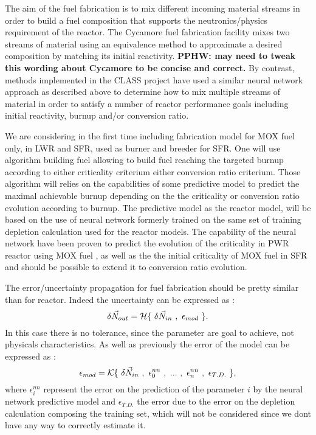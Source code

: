 \documentclass[dvips,12pt]{article}
\newcommand{\comment}[1]
{{\bfseries \color{red} #1}}
\begin{document}
The aim of the fuel fabrication is to mix
different incoming material streams in order to
build a fuel composition that supports the
neutronics/physics requirement of the reactor. The
Cycamore fuel fabrication facility mixes two
streams of material using an equivalence method to
approximate a desired composition by matching its
initial reactivity.  \cite{cycamore_fab}
\comment{PPHW: may need to tweak this wording
  about Cycamore to be concise and correct.}  By
contrast, methods implemented in the CLASS project
have used a similar neural network approach as
described above to determine how to mix multiple
streams of material in order to satisfy a number
of reactor performance goals including initial
reactivity, burnup and/or conversion ratio.

We are
considering in the first time including
fabrication model for MOX fuel only, in LWR and
SFR, used as burner and breeder for SFR. One will
use algorithm building fuel allowing to build fuel
reaching the targeted burnup according to either
criticality criterium either conversion ratio
criterium.  Those algorithm will relies on the
capabilities of some predictive model to predict
the maximal achievable burnup depending on the the
criticality or conversion ratio evolution
according to burnup.  The predictive model as the
reactor model, will be based on the use of neural
network formerly trained on the same set of
training depletion calculation used for the
reactor models. The capability of the neural
network have been proven to predict the evolution
of the criticality in PWR reactor using MOX fuel
\cite{Leniaux.NN, CLASS_UserManual}, as well as
the the initial criticality of MOX fuel in SFR
\cite{CLASS UserManual} and should be possible to
extend it to conversion ratio evolution.

The error/uncertainty propagation for fuel
fabrication should be pretty similar than for
reactor. Indeed the uncertainty can be expressed
as :
\begin{equation}
\delta \vec{N}_{out} = {\cal H}\{~\delta\vec{N}_{in}~,~\epsilon_{mod}~\}.
\end{equation}
In this case there is no tolerance, since the
parameter are goal to achieve, not physicals
characteristics. As well as previously the error
of the model can be expressed as :
\begin{equation}
\epsilon_{mod} = {\cal K}\{~\delta\vec{N}_{in}~,~\epsilon^{nn}_{0}~,~...~,~\epsilon^{nn}_{n}~,~\epsilon_{T.D.}~\},
\end{equation}
 where $\epsilon^{nn}_{i}$ represent the error on
 the prediction of the parameter $i$ by the neural
 network predictive model and $\epsilon_{T.D.}$
 the error due to the error on the depletion
 calculation composing the training set, which
 will not be considered since we dont have any way
 to correctly estimate it.\\
 
\end{document}
